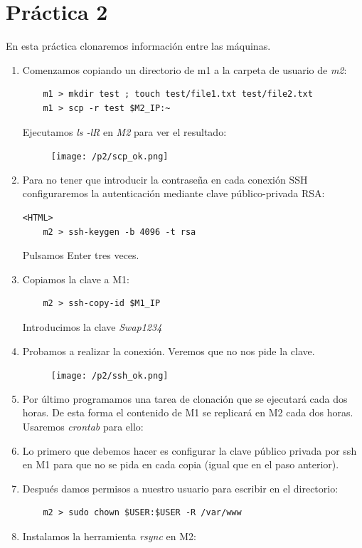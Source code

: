 \documentclass[12pt,spanish]{article}
\begin{document}
\section{Práctica 2}

En esta práctica clonaremos información entre las máquinas.

\begin{enumerate}
	\item Comenzamos copiando un directorio de m1 a la carpeta de usuario de \emph{m2}:
	\begin{lstlisting}
	m1 > mkdir test ; touch test/file1.txt test/file2.txt
	m1 > scp -r test $M2_IP:~
	\end{lstlisting}
	Ejecutamos \emph{ls -lR} en \emph{M2} para ver el resultado:
	\begin{figure}[H]
		\centering
		\texttt{[image: /p2/scp\_ok.png]}
	\end{figure}
	\item Para no tener que introducir la contraseña en cada conexión SSH configuraremos la autenticación mediante clave público-privada RSA:
	\begin{lstlisting}<HTML>
	m2 > ssh-keygen -b 4096 -t rsa
	\end{lstlisting}
	Pulsamos Enter tres veces.
	\item Copiamos la clave a M1:
	\begin{lstlisting}
	m2 > ssh-copy-id $M1_IP
	\end{lstlisting}
	Introducimos la clave \emph{Swap1234}
	\item Probamos a realizar la conexión. Veremos que no nos pide la clave.
	\begin{figure}[H]
		\centering
		\texttt{[image: /p2/ssh\_ok.png]}
	\end{figure}
	\item Por último programamos una tarea de clonación que se ejecutará cada dos horas. De esta forma el contenido de M1 se replicará en M2 cada dos horas. Usaremos \emph{crontab} para ello:
	\item Lo primero que debemos hacer es configurar la clave público privada por ssh en M1 para que no se pida en cada copia (igual que en el paso anterior).
	\item Después damos permisos a nuestro usuario para escribir en el directorio:
	\begin{lstlisting}
	m2 > sudo chown $USER:$USER -R /var/www
	\end{lstlisting}
	\item Instalamos la herramienta \emph{rsync} en M2:

\end{enumerate}
\end{document}
